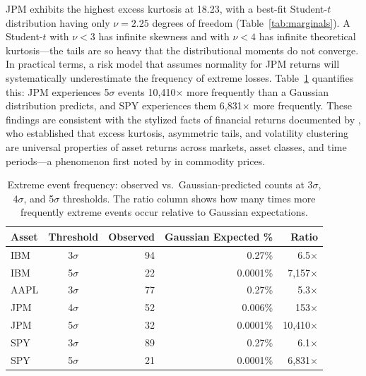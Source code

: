 \documentclass[11pt,a4paper]{article}
\begin{document}
JPM exhibits the highest excess kurtosis at 18.23, with a best-fit Student-$t$ distribution having only $\nu = 2.25$ degrees of freedom (Table~\ref{tab:marginals}).
A Student-$t$ with $\nu < 3$ has infinite skewness and with $\nu < 4$ has infinite theoretical kurtosis---the tails are so heavy that the distributional moments do not converge.
In practical terms, a risk model that assumes normality for JPM returns will systematically underestimate the frequency of extreme losses.
Table~\ref{tab:extremes} quantifies this: JPM experiences 5$\sigma$ events 10{,}410$\times$ more frequently than a Gaussian distribution predicts, and SPY experiences them 6{,}831$\times$ more frequently.
These findings are consistent with the stylized facts of financial returns documented by \citet{cont2001}, who established that excess kurtosis, asymmetric tails, and volatility clustering are universal properties of asset returns across markets, asset classes, and time periods---a phenomenon first noted by \citet{mandelbrot1963} in commodity prices.

\begin{table}[H]
\centering
\caption{Extreme event frequency: observed vs.\ Gaussian-predicted counts at 3$\sigma$, 4$\sigma$, and 5$\sigma$ thresholds. The ratio column shows how many times more frequently extreme events occur relative to Gaussian expectations.}
\label{tab:extremes}
\small
\begin{tabular}{@{}lcrrr@{}}
\toprule
\textbf{Asset} & \textbf{Threshold} & \textbf{Observed} & \textbf{Gaussian Expected \%} & \textbf{Ratio} \\
\midrule
IBM  & 3$\sigma$ & 94  & 0.27\% & 6.5$\times$     \\
IBM  & 5$\sigma$ & 22  & 0.0001\% & 7{,}157$\times$ \\
AAPL & 3$\sigma$ & 77  & 0.27\% & 5.3$\times$     \\
JPM  & 4$\sigma$ & 52  & 0.006\% & 153$\times$     \\
JPM  & 5$\sigma$ & 32  & 0.0001\% & 10{,}410$\times$ \\
SPY  & 3$\sigma$ & 89  & 0.27\% & 6.1$\times$     \\
SPY  & 5$\sigma$ & 21  & 0.0001\% & 6{,}831$\times$ \\
\bottomrule
\end{tabular}
\end{table}
\end{document}
